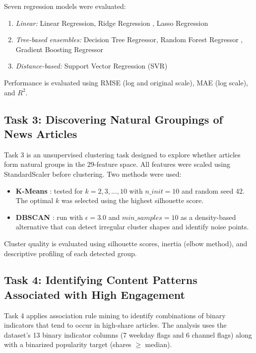 Seven regression models were evaluated:
\begin{enumerate}[leftmargin=1.5em]
    \item \textit{Linear:} Linear Regression, Ridge Regression \cite{montgomery2012linear,hoerl1970ridge}, Lasso Regression
    \item \textit{Tree-based ensembles:} Decision Tree Regressor, Random Forest Regressor \cite{breiman2001rf}, Gradient Boosting Regressor
    \item \textit{Distance-based:} Support Vector Regression (SVR)
\end{enumerate}

Performance is evaluated using RMSE (log and original scale), MAE (log scale), and $R^2$.

\subsection{Task 3: Discovering Natural Groupings of News Articles}
Task 3 is an unsupervised clustering task designed to explore whether articles form natural groups in the 29-feature space. All features were scaled using StandardScaler before clustering. Two methods were used:

\begin{itemize}[leftmargin=1.5em]
    \item \textbf{K-Means} \cite{macqueen1967kmeans}: tested for $k = 2, 3, \ldots, 10$ with $n\_init = 10$ and random seed 42. The optimal $k$ was selected using the highest silhouette score.
    \item \textbf{DBSCAN} \cite{ester1996dbscan}: run with $\epsilon = 3.0$ and $min\_samples = 10$ as a density-based alternative that can detect irregular cluster shapes and identify noise points.
\end{itemize}

Cluster quality is evaluated using silhouette scores, inertia (elbow method), and descriptive profiling of each detected group.

\subsection{Task 4: Identifying Content Patterns Associated with High Engagement}
Task 4 applies association rule mining to identify combinations of binary indicators that tend to occur in high-share articles. The analysis uses the dataset's 13 binary indicator columns (7 weekday flags and 6 channel flags) along with a binarized popularity target (shares $\geq$ median).

